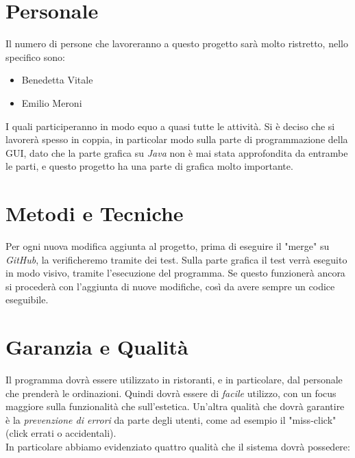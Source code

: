 \documentclass[12pt, letterpaper]{book}
\begin{document}
\section{Personale}
Il numero di persone che lavoreranno a questo progetto sarà molto ristretto, nello specifico sono: 
\begin{itemize}
    \item Benedetta Vitale
    \item Emilio Meroni
\end{itemize}
I quali participeranno in modo equo a quasi tutte le attività. Si è deciso che si lavorerà spesso in coppia, in particolar modo sulla parte di programmazione della GUI, dato che la parte grafica su \textit{Java} non è mai stata approfondita da entrambe le parti, e questo progetto ha una parte di grafica molto importante.
     

\section{Metodi e Tecniche}

Per ogni nuova modifica aggiunta al progetto, prima di eseguire il "merge" su \textit{GitHub}, la verificheremo tramite dei test. Sulla parte grafica il test verrà eseguito in modo visivo, tramite l'esecuzione del programma.
Se questo funzionerà ancora si procederà con l'aggiunta di nuove modifiche, così da avere sempre un codice eseguibile.

\section{Garanzia e Qualità}

Il programma dovrà essere utilizzato in ristoranti, e in particolare, dal personale che prenderà le ordinazioni. Quindi dovrà essere di \textit{facile} utilizzo, con un focus maggiore sulla funzionalità che sull'estetica. Un'altra qualità che dovrà garantire è la \textit{prevenzione di errori} da parte degli utenti, come ad esempio il "miss-click" (click errati o accidentali).\\

In particolare abbiamo evidenziato quattro qualità che il sistema dovrà possedere:
\end{document}
